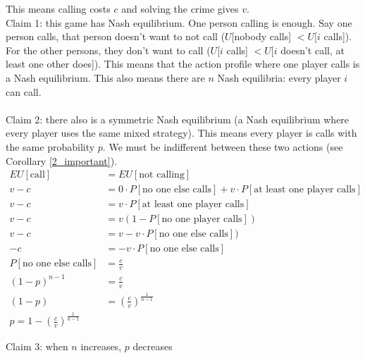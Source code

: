 \begin{illustration}
      This means calling costs $c$ and solving the crime gives $v$.
      \\
      Claim 1: this game has Nash equilibrium.
      One person calling is enough. Say one person calls, that person doesn't want to not call ($U$[nobody calls] $< U$[$i$ calls]). For the other persons, they don't want to call ($U$[$i$ calls] $< U$[$i$ doesn't call, at least one other does]). This means that the action profile where one player calls is a Nash equilibrium. This also means there are $n$ Nash equilibria: every player $i$ can call.\\
      \\
      Claim 2: there also is a symmetric Nash equilibrium (a Nash equilibrium where every player uses the same mixed strategy). This means every player is calls with the same probability $p$. We must be indifferent between these two actions (see Corollary \ref{2_important}).
      \begin{align*}
            EU[\text{call}]             & = EU[\text{not calling}]                                                          \\
            v-c                         & = 0\cdot P[\text{no one else calls}] + v\cdot P[\text{at least one player calls}] \\
            v-c                         & = v\cdot P[\text{at least one player calls}]                                      \\
            v-c                         & = v(1 - P[\text{no one player calls}])                                            \\
            v-c                         & = v - v\cdot P[\text{no one else calls}])                                         \\
            -c                          & = - v\cdot P[\text{no one else calls}]                                            \\
            P[\text{no one else calls}] & = \frac{c}{v}                                                                     \\
            (1-p)^{n-1}                 & = \frac{c}{v}                                                                     \\
            (1-p)                       & = (\frac{c}{v})^{\frac{1}{n-1}}                                                   \\
            p = 1 -(\frac{c}{v})^{\frac{1}{n-1}}
      \end{align*}

      \noindent Claim 3: when $n$ increases, $p$ decreases
\end{illustration}

